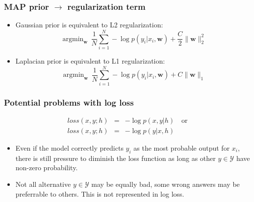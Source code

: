 \documentclass[ignorenonframetext,plain]{beamer}
\DeclareMathOperator*{\argmin}{argmin}
\newcommand{\loss}{\mathit{loss}}
\renewcommand{\vec}{\mathbf}
\begin{document}
\begin{frame}\frametitle{MAP prior $\rightarrow$ regularization term}
\begin{itemize}
\item Gaussian prior is equivalent to L2 regularization: \[
  \argmin_\vec{w}\, \frac{1}{N} \sum_{i=1}^N -\log p(y_i|x_i,\vec{w}) + \frac{C}{2}\|\vec{w}\|_2^2
\]
\item Laplacian prior is equivalent to L1 regularization: \[
  \argmin_\vec{w}\, \frac{1}{N} \sum_{i=1}^N -\log p(y_i|x_i,\vec{w}) + C \|\vec{w}\|_1
\]
\end{itemize}
\end{frame}

\begin{frame}\frametitle{Potential problems with log loss}
\begin{eqnarray*}
\loss(x, y; h) &=& -\log p(x, y | h)\quad\text{or}\\
\loss(x, y; h) &=& -\log p(y | x, h)
\end{eqnarray*}
\begin{itemize}
\item Even if the model correctly predicts $y_i$ as the most probable
  output for $x_i$, there is still pressure to diminish the loss
  function as long as other $y\in\mathcal{Y}$ have non-zero
  probability.
\item Not all alternative $y\in\mathcal{Y}$ may be equally bad, some
  wrong answers may be preferrable to others.  This is not represented
  in log loss.
\end{itemize}
\end{frame}
\end{document}
